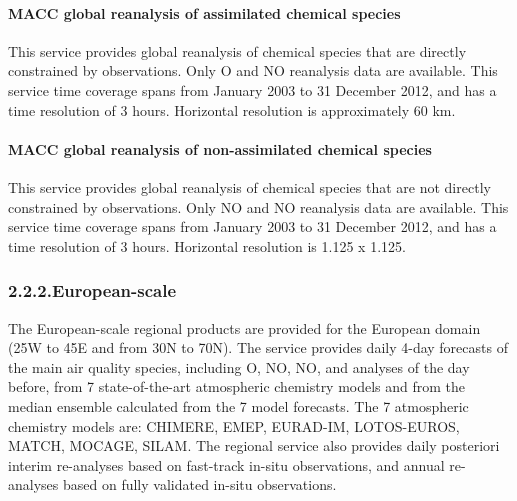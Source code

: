 \documentclass[9pt]{report}
\begin{document}
\paragraph{MACC global reanalysis of assimilated chemical species}\label{sec-macc-global-reanalysis-of-assimilated-chemical-species}%

\noindent{}\mdbr
{}This service provides global reanalysis of chemical species that are directly constrained by observations.
Only O and NO reanalysis data are available. 
This service time coverage spans from January 2003 to 31 December 2012, and has a time resolution of 3 hours.
Horizontal resolution is approximately 60 km.%

\paragraph{MACC global reanalysis of non-assimilated chemical species}\label{sec-macc-global-reanalysis-of-non-assimilated-chemical-species}%

\noindent{}\mdbr
{}This service provides global reanalysis of chemical species that are not directly constrained by observations. 
Only NO and NO reanalysis data are available. 
This service time coverage spans from January 2003 to 31 December 2012, and has a time resolution of 3 hours.
Horizontal resolution is 1.125\textdegree{} x 1.125\textdegree{}.%

\subsubsection{2.2.2.\hspace*{0.5em}European-scale}\label{sec-european-scale}%

\noindent{}The European-scale regional products are provided for the European domain (25\textdegree{}W to 45\textdegree{}E and from 30\textdegree{}N to 70\textdegree{}N). 
The service provides daily 4-day forecasts of the main air quality species, including O, NO, NO, and analyses of the day before, from 7 state-of-the-art atmospheric chemistry models and from the median ensemble calculated from the 7 model forecasts. 
The 7 atmospheric chemistry models are: CHIMERE, EMEP, EURAD-IM, LOTOS-EUROS, MATCH, MOCAGE, SILAM.
The regional service also provides daily posteriori interim re-analyses based on fast-track in-situ observations, and annual re-analyses based on fully validated in-situ observations.%
\end{document}
